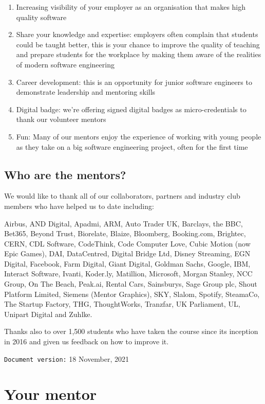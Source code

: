 \documentclass[
]{book}
\providecommand{\tightlist}{%
  \setlength{\itemsep}{0pt}\setlength{\parskip}{0pt}}
\begin{document}
\begin{enumerate}
\def\labelenumi{\arabic{enumi}.}
\tightlist
\item
  Increasing visibility of your employer as an organisation that makes high quality software
\item
  Share your knowledge and expertise: employers often complain that students could be taught better, this is your chance to improve the quality of teaching and prepare students for the workplace by making them aware of the realities of modern software engineering
\item
  Career development: this is an opportunity for junior software engineers to demonstrate leadership and mentoring skills
\item
  Digital badge: we're offering signed digital badges as micro-credentials to thank our volunteer mentors
\item
  Fun: Many of our mentors enjoy the experience of working with young people as they take on a big software engineering project, often for the first time
\end{enumerate}

\hypertarget{thanks}{%
\section{Who are the mentors?}\label{thanks}}

We would like to thank all of our collaborators, partners and industry club members who have helped us to date including:

Airbus, AND Digital, Apadmi, ARM, Auto Trader UK, Barclays, the BBC, Bet365, Beyond Trust, Biorelate, Blaize, Bloomberg, Booking.com, Brightec, CERN, CDL Software, CodeThink, Code Computer Love, Cubic Motion (now Epic Games), DAI, DataCentred, Digital Bridge Ltd, Disney Streaming, EGN Digital, Facebook, Farm Digital, Giant Digital, Goldman Sachs, Google, IBM, Interact Software, Ivanti, Koder.ly, Matillion, Microsoft, Morgan Stanley, NCC Group, On The Beach, Peak.ai, Rental Cars, Sainsburys, Sage Group plc, Shout Platform Limited, Siemens (Mentor Graphics), SKY, Slalom, Spotify, SteamaCo, The Startup Factory, THG, ThoughtWorks, Tranzfar, UK Parliament, UL, Unipart Digital and Zuhlke.

Thanks also to over 1,500 students who have taken the course since its inception in 2016 and given us feedback on how to improve it.

\texttt{Document\ version:} 18 November, 2021

\hypertarget{ourmentor}{%
\chapter{Your mentor}\label{ourmentor}}
\end{document}
